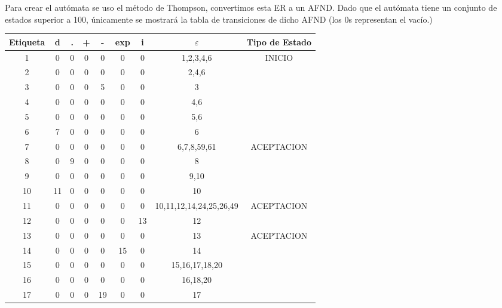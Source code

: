 Para crear el autómata se uso el método de Thompson, convertimos esta ER a un AFND. Dado que el autómata tiene un conjunto de estados superior a 100, únicamente se mostrará la tabla de transiciones de dicho AFND (los $0$s representan el vacío.)
\begin{longtable}{||c||ccccccc||c||}
\hline
\hline
Etiqueta & d   & .  & +  & -   & exp & i   & $\varepsilon$           & Tipo de Estado \\
\hline
\hline
1   & 0   & 0  & 0  & 0   & 0   & 0   & 1,2,3,4,6               & INICIO      \\
2   & 0   & 0  & 0  & 0   & 0   & 0   & 2,4,6                   &             \\
3   & 0   & 0  & 0  & 5   & 0   & 0   & 3                       &             \\
4   & 0   & 0  & 0  & 0   & 0   & 0   & 4,6                     &             \\
5   & 0   & 0  & 0  & 0   & 0   & 0   & 5,6                     &             \\
6   & 7   & 0  & 0  & 0   & 0   & 0   & 6                       &             \\
7   & 0   & 0  & 0  & 0   & 0   & 0   & 6,7,8,59,61             & ACEPTACION  \\
8   & 0   & 9  & 0  & 0   & 0   & 0   & 8                       &             \\
9   & 0   & 0  & 0  & 0   & 0   & 0   & 9,10                    &             \\
10  & 11  & 0  & 0  & 0   & 0   & 0   & 10                      &             \\
11  & 0   & 0  & 0  & 0   & 0   & 0   & 10,11,12,14,24,25,26,49 & ACEPTACION  \\
12  & 0   & 0  & 0  & 0   & 0   & 13  & 12                      &             \\
13  & 0   & 0  & 0  & 0   & 0   & 0   & 13                      & ACEPTACION  \\
14  & 0   & 0  & 0  & 0   & 15  & 0   & 14                      &             \\
15  & 0   & 0  & 0  & 0   & 0   & 0   & 15,16,17,18,20          &             \\
16  & 0   & 0  & 0  & 0   & 0   & 0   & 16,18,20                &             \\
17  & 0   & 0  & 0  & 19  & 0   & 0   & 17                      &             \\

\end{longtable}
